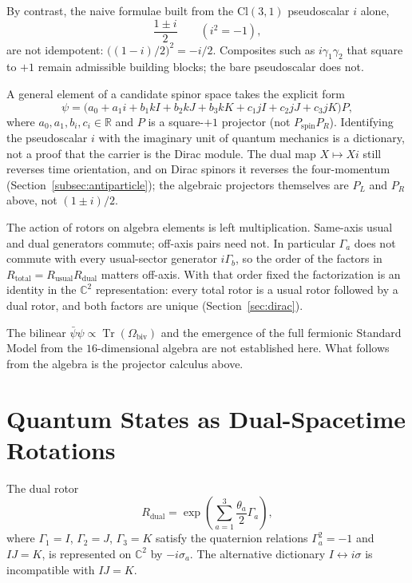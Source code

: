 \documentclass[a4paper]{article}
\begin{document}
By contrast, the naive formulae built from the $\mathrm{Cl}(3,1)$ pseudoscalar $i$ alone,
\[
\frac{1\pm i}{2}\qquad(i^2=-1),
\]
are not idempotent: $\bigl((1-i)/2\bigr)^2=-i/2$. Composites such as $i\gamma_1\gamma_2$ that square to $+1$ remain admissible building blocks; the bare pseudoscalar does not.

A general element of a candidate spinor space takes the explicit form
\[
\psi = \bigl( a_0 + a_1 i + b_1 kI + b_2 kJ + b_3 kK + c_1 jI + c_2 jJ + c_3 jK \bigr) P,
\]
where $a_0,a_1,b_i,c_i \in \mathbb{R}$ and $P$ is a square-$+1$ projector (not $P_{\mathrm{spin}}P_R$). Identifying the pseudoscalar $i$ with the imaginary unit of quantum mechanics is a dictionary, not a proof that the carrier is the Dirac module. The dual map $X \mapsto X i$ still reverses time orientation, and on Dirac spinors it reverses the four-momentum (Section~\ref{subsec:antiparticle}); the algebraic projectors themselves are $P_L$ and $P_R$ above, not $(1\pm i)/2$.

The action of rotors on algebra elements is left multiplication. Same-axis usual and dual generators commute; off-axis pairs need not. In particular $\Gamma_a$ does not commute with every usual-sector generator $i\Gamma_b$, so the order of the factors in $R_{\mathrm{total}}=R_{\mathrm{usual}}R_{\mathrm{dual}}$ matters off-axis. With that order fixed the factorization is an identity in the $\mathbb{C}^2$ representation: every total rotor is a usual rotor followed by a dual rotor, and both factors are unique (Section~\ref{sec:dirac}).

The bilinear $\bar{\psi}\psi\propto\operatorname{Tr}(\Omega_{\mathrm{biv}})$ and the emergence of the full fermionic Standard Model from the $16$-dimensional algebra are not established here. What follows from the algebra is the projector calculus above.

\section{Quantum States as Dual-Spacetime Rotations}
\label{sec:quantumstates}

The dual rotor
\[
R_\text{dual} = \exp\left( \sum_{a=1}^3 \frac{\theta_a}{2} \Gamma_a \right),
\]
where $\Gamma_1 = I$, $\Gamma_2 = J$, $\Gamma_3 = K$ satisfy the quaternion relations $\Gamma_a^2 = -1$ and $IJ=K$, is represented on $\mathbb{C}^2$ by $-i\sigma_a$. The alternative dictionary $I\leftrightarrow i\sigma$ is incompatible with $IJ=K$.
\end{document}
